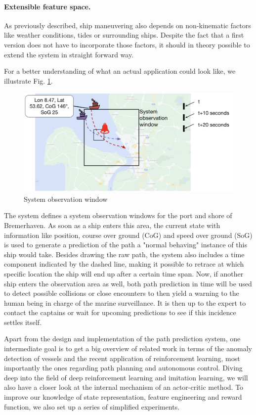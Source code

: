 \paragraph{Extensible feature space.}
As previously described, ship maneuvering also depends on non-kinematic factors like weather conditions, tides or surrounding ships. Despite the fact that a first version does not have to incorporate those factors, it should in theory possible to extend the system in straight forward way.


For a better understanding of what an actual application could look like, we illustrate Fig. \ref{fig:systemObservation}.
\begin{figure}[H]
    \centering
    \includegraphics[width=\textwidth]{images/system_observation.png}
    \caption{System observation window}
    \label{fig:systemObservation}
\end{figure}

The system defines a system observation windows for the port and shore of Bremerhaven. As soon as a ship enters this area, the current state with information like position, course over ground (CoG) and speed over ground (SoG) is used to generate a prediction of the path a "normal behaving" instance of this ship would take. Besides drawing the raw path, the system also includes a time component indicated by the dashed line, making it possible to retrace at which specific location the ship will end up after a certain time span. Now, if another ship enters the observation area as well, both path prediction in time will be used to detect possible collisions or close encounters to then yield a warning to the human being in charge of the marine surveillance. It is then up to the expert to contact the captains or wait for upcoming predictions to see if this incidence settles itself.
\par
Apart from the design and implementation of the path prediction system, one intermediate goal is to get a big overview of related work in terms of the anomaly detection of vessels and the recent application of reinforcement learning, most importantly the ones regarding path planning and autonomous control. Diving deep into the field of deep reinforcement learning and imitation learning, we will also have a closer look at the internal mechanism of an actor-critic method. To improve our knowledge of state representation, feature engineering and reward function, we also set up a series of simplified experiments.